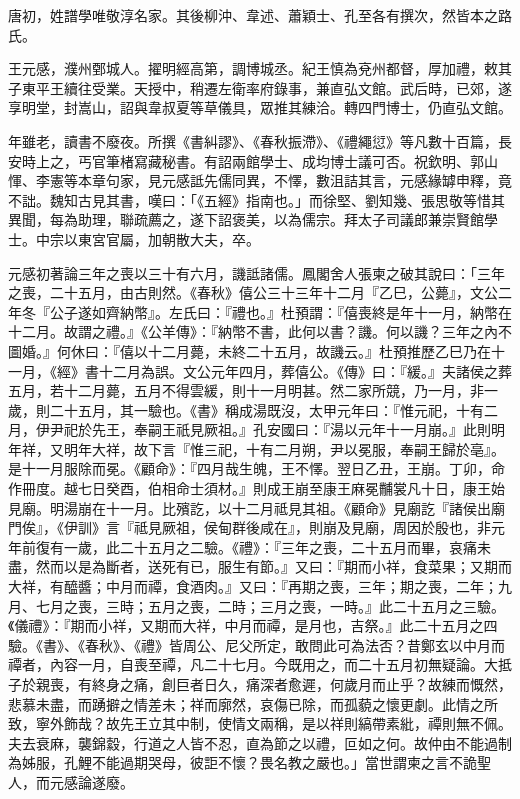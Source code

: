 \begin{pinyinscope}
 唐初，姓譜學唯敬淳名家。其後柳沖、韋述、蕭穎士、孔至各有撰次，然皆本之路氏。



 王元感，濮州鄄城人。擢明經高第，調博城丞。紀王慎為兗州都督，厚加禮，敕其子東平王續往受業。天授中，稍遷左衛率府錄事，兼直弘文館。武后時，已郊，遂享明堂，封嵩山，詔與韋叔夏等草儀具，眾推其練洽。轉四門博士，仍直弘文館。



 年雖老，讀書不廢夜。所撰《書糾謬》、《春秋振滯》、《禮繩愆》等凡數十百篇，長安時上之，丐官筆楮寫藏秘書。有詔兩館學士、成均博士議可否。祝欽明、郭山惲、李憲等本章句家，見元感詆先儒同異，不懌，數沮詰其言，元感緣罅申釋，竟不詘。魏知古見其書，嘆曰：「《五經》指南也。」而徐堅、劉知幾、張思敬等惜其異聞，每為助理，聯疏薦之，遂下詔褒美，以為儒宗。拜太子司議郎兼崇賢館學士。中宗以東宮官屬，加朝散大夫，卒。



 元感初著論三年之喪以三十有六月，譏詆諸儒。鳳閣舍人張柬之破其說曰：「三年之喪，二十五月，由古則然。《春秋》僖公三十三年十二月『乙巳，公薨』，文公二年冬『公子遂如齊納幣』。左氏曰：『禮也。』杜預謂：『僖喪終是年十一月，納幣在十二月。故謂之禮。』《公羊傳》：『納幣不書，此何以書？譏。何以譏？三年之內不圖婚。』何休曰：『僖以十二月薨，未終二十五月，故譏云。』杜預推歷乙巳乃在十一月，《經》書十二月為誤。文公元年四月，葬僖公。《傳》曰：『緩。』夫諸侯之葬五月，若十二月薨，五月不得雲緩，則十一月明甚。然二家所競，乃一月，非一歲，則二十五月，其一驗也。《書》稱成湯既沒，太甲元年曰：『惟元祀，十有二月，伊尹祀於先王，奉嗣王祇見厥祖。』孔安國曰：『湯以元年十一月崩。』此則明年祥，又明年大祥，故下言『惟三祀，十有二月朔，尹以冕服，奉嗣王歸於亳』。是十一月服除而冕。《顧命》：『四月哉生魄，王不懌。翌日乙丑，王崩。丁卯，命作冊度。越七日癸酉，伯相命士須材。』則成王崩至康王麻冕黼裳凡十日，康王始見廟。明湯崩在十一月。比殯訖，以十二月祗見其祖。《顧命》見廟訖『諸侯出廟門俟』，《伊訓》言『祗見厥祖，侯甸群後咸在』，則崩及見廟，周因於殷也，非元年前復有一歲，此二十五月之二驗。《禮》：『三年之喪，二十五月而畢，哀痛未盡，然而以是為斷者，送死有已，服生有節。』又曰：『期而小祥，食菜果；又期而大祥，有醯醬；中月而禫，食酒肉。』又曰：『再期之喪，三年；期之喪，二年；九月、七月之喪，三時；五月之喪，二時；三月之喪，一時。』此二十五月之三驗。《儀禮》：『期而小祥，又期而大祥，中月而禫，是月也，吉祭。』此二十五月之四驗。《書》、《春秋》、《禮》皆周公、尼父所定，敢問此可為法否？昔鄭玄以中月而禫者，內容一月，自喪至禫，凡二十七月。今既用之，而二十五月初無疑論。大抵子於親喪，有終身之痛，創巨者日久，痛深者愈遲，何歲月而止乎？故練而慨然，悲慕未盡，而踴擗之情差未；祥而廓然，哀傷已除，而孤藐之懷更劇。此情之所致，寧外飾哉？故先王立其中制，使情文兩稱，是以祥則縞帶素紕，禫則無不佩。夫去衰麻，襲錦縠，行道之人皆不忍，直為節之以禮，叵如之何。故仲由不能過制為姊服，孔鯉不能過期哭母，彼詎不懷？畏名教之嚴也。」當世謂柬之言不詭聖人，而元感論遂廢。




\end{pinyinscope}

